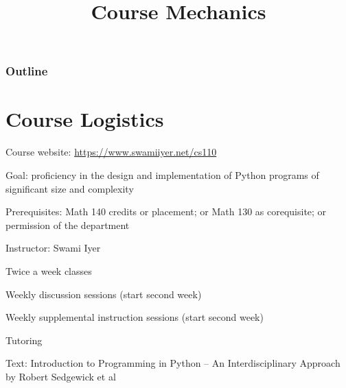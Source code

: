 \documentclass[8pt,a4paper,compress]{beamer}
\title{Course Mechanics}
\date{}
\begin{document}
\begin{frame}
\vfill
\titlepage
\end{frame}

\begin{frame}
\frametitle{Outline}
\tableofcontents
\end{frame}

\section{Course Logistics}
\begin{frame}[fragile]
\pause

Course website: \href{https://www.swamiiyer.net/cs110}{https://www.swamiiyer.net/cs110 \ExternalLink}

\pause
\bigskip

Goal: proficiency in the design and implementation of Python programs of significant size and complexity

\pause
\bigskip

Prerequisites: Math 140 credits or placement; or Math 130 as corequisite; or permission of the department

\pause
\bigskip

Instructor: Swami Iyer

\pause
\bigskip

Twice a week classes

\pause
\bigskip

Weekly discussion sessions (start second week)

\pause
\bigskip

Weekly supplemental instruction sessions (start second week)

\pause
\bigskip

Tutoring

\pause
\bigskip

Text: Introduction to Programming in Python -- An Interdisciplinary Approach by Robert Sedgewick et al
\end{frame}
\end{document}

